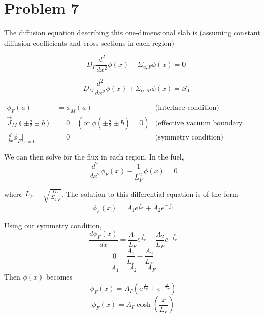 \documentclass{article}
\newcommand{\Xs}{\Sigma}
\newcommand{\cur}{\vec{J}}
\begin{document}

\section*{Problem 7}

The diffusion equation describing this one-dimensional slab is (assuming constant diffusion coefficients and cross sections in each region)

$$ -D_F\frac{d^2}{dx^2}\phi(x) + \Xs_{a,F}\phi(x) = 0 $$

$$ -D_M\frac{d^2}{dx^2}\phi(x) + \Xs_{a,M}\phi(x) = S_0 $$

\begin{align*}
\phi_F(a) 	&= \phi_M(a)  & \text{(interface condition)} \\
\cur_M\left(\pm\frac{a}{2} \pm b\right)	&= 0 \quad (\text{or }\phi\left(\pm \frac{a}{2} \pm \tilde{b}\right)=0) & \text{(effective vacuum boundary condition)}\\
\frac{d}{dx}\phi_F\bigg|_{x=0}	&= 0 & \text{(symmetry condition)}
\end{align*}

We can then solve for the flux in each region. In the fuel,
$$ \frac{d^2}{dx^2}\phi_F(x) - \frac{1}{L_F^2}\phi(x) = 0 $$

where $L_F = \sqrt{\frac{D_F}{\Xs_{a,F}}}$. The solution to this differential equation is of the form
$$ \phi_F(x) = A_1 e^{\frac{x}{L_F}} + A_2 e^{-\frac{x}{L_F}} $$

Using our symmetry condition,
$$ \frac{d\phi_F(x)}{dx} = \frac{A_1}{L_F}e^{\frac{x}{L_F}} - \frac{A_2}{L_F} e^{-\frac{x}{L_F}} $$
$$ 0 = \frac{A_1}{L_F} - \frac{A_2}{L_F} $$
$$ A_1 = A_2 = A_F $$
Then $\phi(x)$ becomes
$$ \phi_F(x) = A_F \left(e^{\frac{x}{L_F}} + e^{-\frac{x}{L_F}}\right) $$
$$ \phi_F(x) = A_F \cosh\left(\frac{x}{L_F}\right) $$
\end{document}
